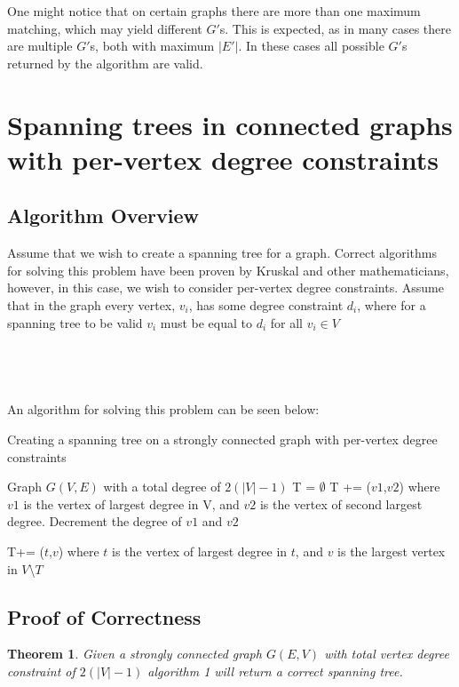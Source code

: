 \documentclass{article}
\begin{document}
	One might notice that on certain graphs there are more than one maximum matching, which may yield different $G'$s. This is expected, as in many cases there are multiple $G'$s, both with maximum $|E'|$. In these cases all possible $G'$s returned by the algorithm are valid.

	\newtheorem{theorem}{Theorem}
	\section{Spanning trees in connected graphs with per-vertex degree constraints}
	\subsection{Algorithm Overview}
	Assume that we wish to create a spanning tree for a graph. Correct algorithms for solving this problem have been proven by Kruskal and other
	mathematicians, however, in this case, we wish to consider per-vertex degree constraints. Assume that in the graph every vertex, $v_{i}$, has some degree constraint $d_{i}$,
	where for a spanning tree to be valid $v_{i}$ must be equal to $d_{i}$ for all $v_{i} \in V$
	\\\\\\\\\\
	
	An algorithm for solving this problem can be seen below:
	\\

		\begin{algorithm}[H]
		\caption{Creating a spanning tree on a strongly connected graph with per-vertex degree constraints}
		\begin{algorithmic}[1]
			\State Graph $G(V,E)$ with a total degree of $2(|V|-1)$
			\State T = $\emptyset$
			\State T += ($v1$,$v2$) where $v1$ is the vertex of largest degree in V, and $v2$ is the vertex of second largest degree. Decrement the degree of $v1$ and $v2$
			\State \parbox[t]{\dimexpr\linewidth-\algorithmicindent}{T+= ($t$,$v$) where $t$ is the vertex of largest degree in $t$, and $v$ is the largest vertex in $V$\textbackslash$T$\strut}
			\EndWhile
		\end{algorithmic}
	\newpage
	\end{algorithm}
	\subsection{Proof of Correctness}
	\begin{theorem}
		Given a strongly connected graph $G(E,V)$ with total vertex degree constraint of $2(|V|-1)$ algorithm 1 will return a correct spanning tree.
	\end{theorem}
\end{document}
